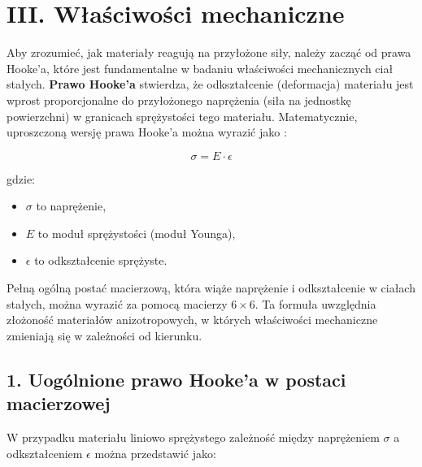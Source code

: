 {}
\justify
\fontsize{14}{16}\selectfont
\setlength{\parindent}{0pt}
\chapter*{III. Właściwości mechaniczne \cite{alma991000386409708832, kittel1976wstep, alma991001031769708832, alma991053253943408832}} 
\fontsize{12}{14}\selectfont
\vspace{\baselineskip} 

Aby zrozumieć, jak materiały reagują na przyłożone siły, należy zacząć od prawa Hooke'a, które jest fundamentalne w badaniu właściwości mechanicznych ciał stałych. \textbf{Prawo Hooke'a} stwierdza, że odkształcenie (deformacja) materiału jest wprost proporcjonalne do przyłożonego naprężenia (siła na jednostkę powierzchni) w granicach sprężystości tego materiału. Matematycznie, uproszczoną wersję prawa Hooke'a można wyrazić jako \cite{alma991053253943408832, alma991000386409708832}:

$$
\sigma = E \cdot \epsilon
$$

gdzie:
\begin{itemize}
 \item  $\sigma$ to naprężenie,
 \item  $E$ to moduł sprężystości (moduł Younga),
 \item  $\epsilon$ to odkształcenie sprężyste.
\end{itemize}


Pełną ogólną postać macierzową, która wiąże naprężenie i odkształcenie w ciałach stałych, można wyrazić za pomocą macierzy $6 \times 6$. Ta formuła uwzględnia złożoność materiałów anizotropowych, w których właściwości mechaniczne zmieniają się w zależności od kierunku.
{}
\section*{1. Uogólnione prawo Hooke'a w postaci macierzowej \cite{kittel1976wstep, alma991001031769708832}}
\vspace{-1.0em}
\label{sec:spacing_font_size}
W przypadku materiału liniowo sprężystego zależność między naprężeniem $\sigma$ a odkształceniem $\epsilon$ można przedstawić jako:

